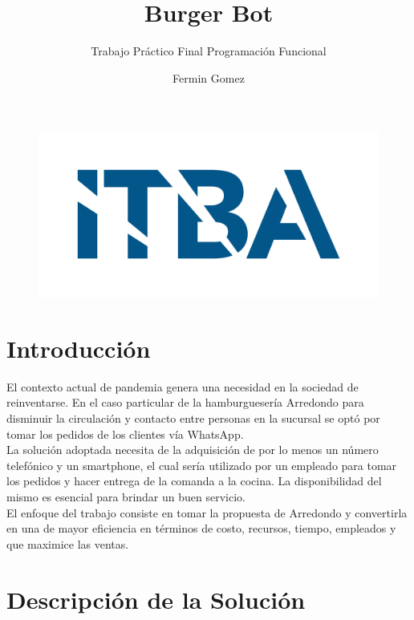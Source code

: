\documentclass[a4paper,12pt]{article}
\title{Burger Bot}
\subtitle{Trabajo Práctico Final Programación Funcional}
\author{Fermin Gomez}
\begin{document}
\maketitle

\begin{figure}[H]
	\centering
	\includegraphics[width=0.7\linewidth]{itba}
\end{figure}

\pagebreak

\tableofcontents

\pagebreak

\section{Introducción}

El contexto actual de pandemia genera una necesidad en la sociedad de reinventarse. En el caso particular de la hamburguesería Arredondo para disminuir la circulación y contacto entre personas en la sucursal se optó por tomar los pedidos de los clientes vía WhatsApp. 
\\
La solución adoptada necesita de la adquisición de por lo menos un número telefónico y un smartphone, el cual sería utilizado por un empleado para tomar los pedidos y hacer entrega de la comanda a la cocina. La disponibilidad del mismo es esencial para brindar un buen servicio. 
\\
El enfoque del trabajo consiste en tomar la propuesta de Arredondo y convertirla en una de mayor eficiencia en términos de costo, recursos, tiempo, empleados y que maximice las ventas.  

\section{Descripción de la Solución}
\end{document}
